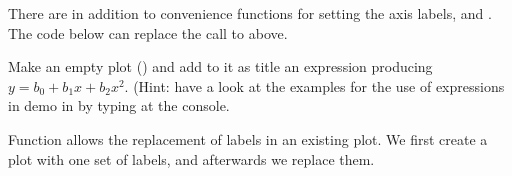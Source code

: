 \documentclass[krantz2]{krantz}\usepackage{knitr}%
\begin{document}
There are in addition to  convenience functions for setting the axis labels,  and . The code below can replace the call to  above.

\begin{knitrout}\footnotesize
{}\color{fgcolor}\begin{kframe}
\begin{alltt}
  \hlstd{(}\hlstd{)} \hlopt{+}
  \hlstd{(}\hlstd{)} \hlopt{+}
  \hlstd{(}\hlstd{,}
           \hlstd{=} \hlstd{,}
           \hlstd{=} \hlstd{)}
\end{alltt}
\end{kframe}
\end{knitrout}

\begin{playground}
Make an empty plot () and add to it as title an expression producing $y = b_0 + b_1 x + b_2 x^2$. (Hint: have a look at the examples for the use of expressions in  demo in \Rlang by typing  at the \Rlang console.
\end{playground}

Function  allows the replacement of labels in an existing plot. We first create a plot with one set of labels, and afterwards we replace them.

\begin{knitrout}\footnotesize
{}\color{fgcolor}\begin{kframe}
\begin{alltt}
 \hlkwb{<-}
    \hlstd{(} 
           \hlstd{(}     \hlstd{=} 
                \hlstd{=}  \hlopt{+}
      \hlstd{()} \hlopt{+}
      \hlstd{(} \hlstd{=} \hlstd{,}
            \hlstd{=} \hlstd{,}
            \hlstd{=} \hlstd{,}
            \hlstd{=} \hlstd{)}
\end{alltt}
\end{kframe}
\end{knitrout}
\end{document}
